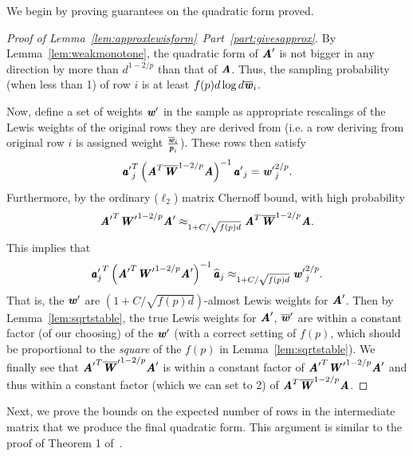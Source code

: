 We begin by proving guarantees on the quadratic form proved.

\begin{proof}[Proof of Lemma~\ref{lem:approxlewisform}~Part~\ref{part:givesapprox}]
By Lemma~\ref{lem:weakmonotone}, the quadratic form of $\AA'$ is not bigger in any
direction by more than $d^{1-2/p}$ than that of $\AA$. Thus, the sampling probability
(when less than 1) of row $i$ is at least $f(p) d \log d \wwbar_i$.

Now, define a set of weights $\ww'$ in the sample as appropriate rescalings of the Lewis weights
of the original rows they are derived from (i.e. a row deriving from original row $i$ is assigned
weight $\frac{\wwbar_i}{\pp_i}$).  These rows then satisfy
\begin{equation*}
{\aa'}_j^T \left( \AA^T \WWbar^{1 - 2/p} \AA \right )^{-1} {\aa'}_j = {\ww'}_j^{2/p}.
\end{equation*}
Furthermore, by the ordinary ($\ell_2$) matrix Chernoff bound, with high probability
\begin{equation*}
{\AA'}^T {\WW'}^{1 - 2/p} {\AA'} \approx_{1+C / \sqrt{f(p) d}} \AA^T \WWbar^{1-2/p} \AA.
\end{equation*}
This implies that
\begin{equation*}
{\aa'_j}^T \left( {\AA'}^T {\WW'}^{1 - 2/p} {\AA'} \right )^{-1} \widehat \aa_j \approx_{1+C / \sqrt{f(p) d}} {\ww'}_j^{2/p}.
\end{equation*}
That is, the $\ww'$ are $(1+C / \sqrt{f(p) d})$-almost Lewis weights for $\AA'$.  Then by Lemma~\ref{lem:sqrtstable},
the true Lewis weights for $\AA'$, $\wwbar'$ are within a constant factor (of our choosing) of the $\ww'$
(with a correct setting of $f(p)$, which should be proportional to the \emph{square} of the $f(p)$
in Lemma~\ref{lem:sqrtstable}).  We finally see that ${\AA'}^T {\WWbar'}^{1-2/p} \AA'$ is within
a constant factor of ${\AA'}^T {\WW'}^{1-2/p} {\AA'}$ and thus within a constant factor
(which we can set to 2) of $\AA^T \WWbar^{1-2/p} \AA$.
\end{proof}

Next, we prove the bounds on the expected number of rows in the
intermediate matrix that we produce the final quadratic form.
This argument is similar to the proof of
Theorem 1 of~\cite{CohenLMMPS14:arxiv}.


